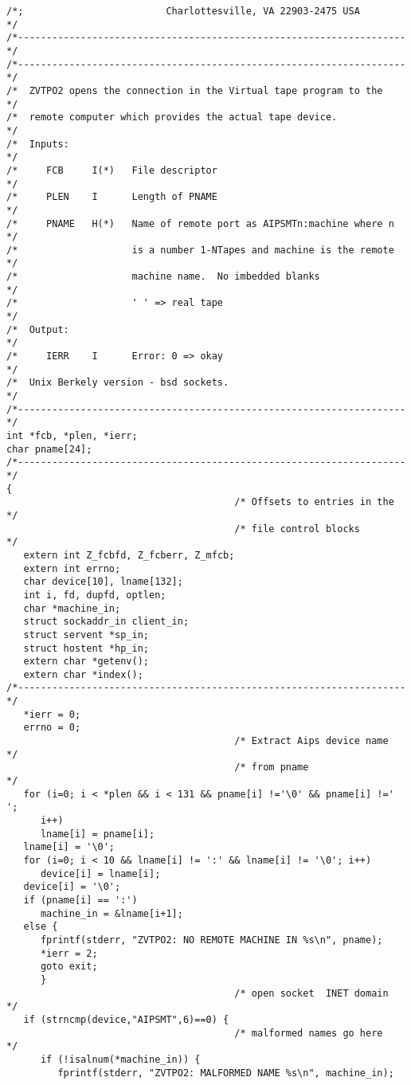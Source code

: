 \begin{center}
\begin{verbatim}
/*;                         Charlottesville, VA 22903-2475 USA        */
/*--------------------------------------------------------------------*/
/*--------------------------------------------------------------------*/
/*  ZVTPO2 opens the connection in the Virtual tape program to the    */
/*  remote computer which provides the actual tape device.            */
/*  Inputs:                                                           */
/*     FCB     I(*)   File descriptor                                 */
/*     PLEN    I      Length of PNAME                                 */
/*     PNAME   H(*)   Name of remote port as AIPSMTn:machine where n  */
/*                    is a number 1-NTapes and machine is the remote  */
/*                    machine name.  No imbedded blanks               */
/*                    ' ' => real tape                                */
/*  Output:                                                           */
/*     IERR    I      Error: 0 => okay                                */
/*  Unix Berkely version - bsd sockets.                               */
/*--------------------------------------------------------------------*/
int *fcb, *plen, *ierr;
char pname[24];
/*--------------------------------------------------------------------*/
{
                                        /* Offsets to entries in the  */
                                        /* file control blocks        */
   extern int Z_fcbfd, Z_fcberr, Z_mfcb;
   extern int errno;
   char device[10], lname[132];
   int i, fd, dupfd, optlen;
   char *machine_in;
   struct sockaddr_in client_in;
   struct servent *sp_in;
   struct hostent *hp_in;
   extern char *getenv();
   extern char *index();
/*--------------------------------------------------------------------*/
   *ierr = 0;
   errno = 0;
                                        /* Extract Aips device name   */
                                        /* from pname                 */
   for (i=0; i < *plen && i < 131 && pname[i] !='\0' && pname[i] !=' ';
      i++)
      lname[i] = pname[i];
   lname[i] = '\0';
   for (i=0; i < 10 && lname[i] != ':' && lname[i] != '\0'; i++)
      device[i] = lname[i];
   device[i] = '\0';
   if (pname[i] == ':')
      machine_in = &lname[i+1];
   else {
      fprintf(stderr, "ZVTPO2: NO REMOTE MACHINE IN %s\n", pname);
      *ierr = 2;
      goto exit;
      }
                                        /* open socket  INET domain   */
   if (strncmp(device,"AIPSMT",6)==0) {
                                        /* malformed names go here    */
      if (!isalnum(*machine_in)) {
         fprintf(stderr, "ZVTPO2: MALFORMED NAME %s\n", machine_in);

\end{verbatim}
\end{center}
